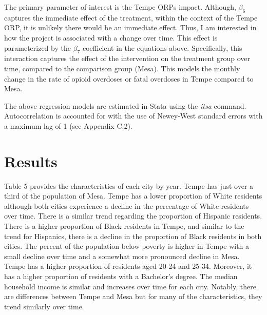 The primary parameter of interest is the Tempe ORPs impact. Although, \(\beta_6\) captures the immediate effect of the treatment, within the context of the Tempe ORP, it is unlikely there would be an immediate effect. Thus, I am interested in how the project is associated with a change over time. This effect is parameterized by the \(\beta_7\) coefficient in the equations above. Specifically, this interaction captures the effect of the intervention on the treatment group over time, compared to the comparison group (Mesa). This models the monthly change in the rate of opioid overdoses or fatal overdoses in Tempe compared to Mesa. 

The above regression models are estimated in Stata \parencite{statacorp_stata_2023} using the \textit{itsa} command. Autocorrelation is accounted for with the use of Newey-West standard errors with a maximum lag of 1 (see Appendix C.2).

\section{\centering Results}
Table 5 provides the characteristics of each city by year. Tempe has just over a third of the population of Mesa. Tempe has a lower proportion of White residents although both cities experience a decline in the percentage of White residents over time. There is a similar trend regarding the proportion of Hispanic residents. There is a higher proportion of Black residents in Tempe, and similar to the trend for Hispanics, there is a decline in the proportion of Black residents in both cities. The percent of the population below poverty is higher in Tempe with a small decline over time and a somewhat more pronounced decline in Mesa. Tempe has a higher proportion of residents aged 20-24 and 25-34. Moreover, it has a higher proportion of residents with a Bachelor's degree. The median household income is similar and increases over time for each city. Notably, there are differences between Tempe and Mesa but for many of the characteristics, they trend similarly over time. 

